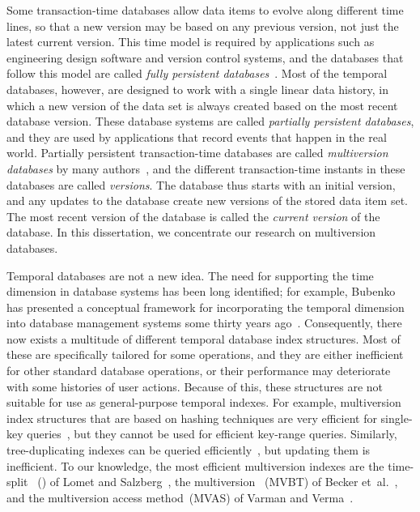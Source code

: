 Some transaction-time databases allow data items to evolve along
different time lines, so that a new version may be based on any
previous version, not just the latest current version.
This time model is required by applications such as engineering design
software and version control systems, and the databases that
follow this model are called \emph{fully
persistent databases}~\cite{salzberg:2004:framework}. 
Most of the temporal databases, however, are designed to work with a single
linear data history, in which a new version of the data set is always created
based on the most recent database version.
These database systems are called \emph{partially persistent databases}, and
they are used by applications that record events that happen in the
real world.
Partially persistent transaction-time databases are called
\emph{multiversion databases} by many
authors~\cite{becker:1996:mvbt,bercken:1996:multiversion,jouini:2007:multiversion,lomet:1989:tsb,varman:1997:multiversion},
and the different transaction-time instants in these databases
are called \emph{versions}.
The database thus starts with an initial version, and any updates to the
database create new versions of the stored data item set.
The most recent version of the database is called the \emph{current version}
of the database.
In this dissertation, we concentrate our research on multiversion
databases.

Temporal databases are not a new idea.
The need for supporting the time dimension in database systems has
been long identified; for example, Bubenko has presented a conceptual
framework for incorporating the temporal dimension into database
management systems some thirty years ago~\cite{bubenko:1977:temporal}.
Consequently, there now exists a multitude of different temporal
database index structures.
Most of these are specifically tailored for
some operations, and they are either inefficient for other standard
database operations, or their performance may deteriorate with some
histories of user actions.
Because of this, these structures are not suitable for use as 
general-purpose temporal indexes.
For example, multiversion index structures that are based on hashing
techniques are very efficient for single-key
queries~\cite{kollios:2002:hashing}, but they cannot be used for
efficient key-range queries.
Similarly, tree-duplicating 
indexes can be queried efficiently~\cite{salzberg:1999:comparison}, but
updating them is inefficient.
To our knowledge, the most efficient multiversion 
indexes are the time-split \Btree~(\TSBtree) of Lomet and
Salzberg~\cite{lomet:1990:tsb-performance,lomet:1989:tsb}, the multiversion
\Btree~(MVBT) of Becker et~al.~\cite{becker:1993:optimal,becker:1996:mvbt},
and the multiversion access method~(MVAS) of Varman and
Verma~\cite{varman:1997:multiversion}.

